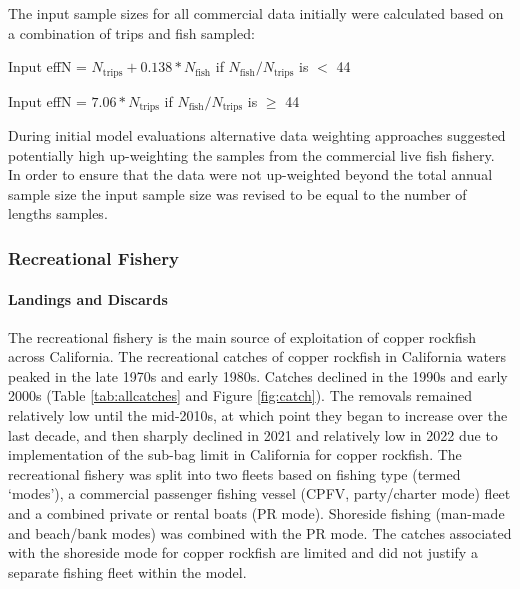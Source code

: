\documentclass[11pt,
  english,
  letterpaper,
]{article}
\begin{document}
The input sample sizes for all commercial data initially were calculated based on a combination of trips and fish sampled:

\begin{centering}

Input effN = $N_{\text{trips}} + 0.138 * N_{\text{fish}}$ if $N_{\text{fish}}/N_{\text{trips}}$ is $<$ 44

Input effN = $7.06 * N_{\text{trips}}$ if $N_{\text{fish}}/N_{\text{trips}}$ is $\geq$ 44

\end{centering}

During initial model evaluations alternative data weighting approaches suggested potentially high up-weighting the samples from the commercial live fish fishery. In order to ensure that the data were not up-weighted beyond the total annual sample size the input sample size was revised to be equal to the number of lengths samples.

\hypertarget{recreational-fishery}{%
\subsubsection{Recreational Fishery}\label{recreational-fishery}}

\hypertarget{landings-and-discards-1}{%
\paragraph{Landings and Discards}\label{landings-and-discards-1}}

\hfill\break

The recreational fishery is the main source of exploitation of copper rockfish across California. The recreational catches of copper rockfish in California waters peaked in the late 1970s and early 1980s. Catches declined in the 1990s and early 2000s (Table \ref{tab:allcatches} and Figure \ref{fig:catch}). The removals remained relatively low until the mid-2010s, at which point they began to increase over the last decade, and then sharply declined in 2021 and relatively low in 2022 due to implementation of the sub-bag limit in California for copper rockfish. The recreational fishery was split into two fleets based on fishing type (termed `modes'), a commercial passenger fishing vessel (CPFV, party/charter mode) fleet and a combined private or rental boats (PR mode). Shoreside fishing (man-made and beach/bank modes) was combined with the PR mode. The catches associated with the shoreside mode for copper rockfish are limited and did not justify a separate fishing fleet within the model.
\end{document}
